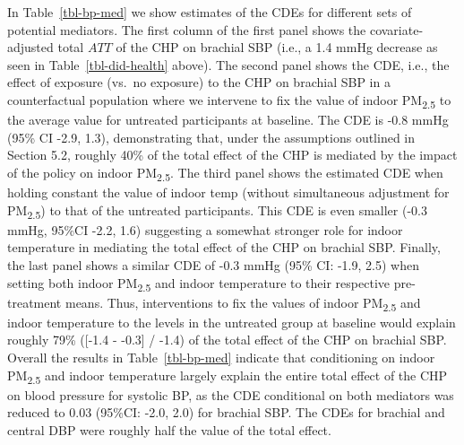 \documentclass[
  letterpaper,
  DIV=11,
  numbers=noendperiod]{scrartcl}
\begin{document}
In Table~\ref{tbl-bp-med} we show estimates of the CDEs for different
sets of potential mediators.  The first column of the
first panel shows the covariate-adjusted total \(ATT\) of the CHP on
brachial SBP (i.e., a 1.4 mmHg decrease as seen in
Table~\ref{tbl-did-health} above). The second panel shows the CDE, i.e.,
the effect of exposure (vs.~no exposure) to the CHP on brachial SBP in a
counterfactual population where we intervene to fix the value of indoor
PM\textsubscript{2.5} to the average value for untreated participants at
baseline. The CDE is -0.8 mmHg (95\% CI -2.9, 1.3), demonstrating that,
under the assumptions outlined in Section 5.2, roughly 40\% of the total
effect of the CHP is mediated by the impact of the policy on indoor
PM\textsubscript{2.5}. The third panel shows the estimated CDE when
holding constant the value of indoor temp (without simultaneous
adjustment for PM\textsubscript{2.5}) to that of the untreated
participants. This CDE is even smaller (-0.3 mmHg, 95\%CI -2.2, 1.6)
suggesting a somewhat stronger role for indoor temperature in mediating
the total effect of the CHP on brachial SBP. Finally, the last panel
shows a similar CDE of -0.3 mmHg (95\% CI: -1.9, 2.5) when setting both
indoor PM\textsubscript{2.5} and indoor temperature to their respective
pre-treatment means. Thus, interventions to fix the values of indoor
PM\textsubscript{2.5} and indoor temperature to the levels in the
untreated group at baseline would explain roughly 79\% ({[}-1.4 -
-0.3{]} / -1.4) of the total effect of the CHP on brachial SBP. Overall
the results in Table~\ref{tbl-bp-med} indicate that conditioning on
indoor PM\textsubscript{2.5} and indoor temperature largely explain the
entire total effect of the CHP on blood pressure for systolic BP, as the
CDE conditional on both mediators was reduced to 0.03 (95\%CI: -2.0,
2.0) for brachial SBP. The CDEs for brachial and central DBP were
roughly half the value of the total effect.
\end{document}
